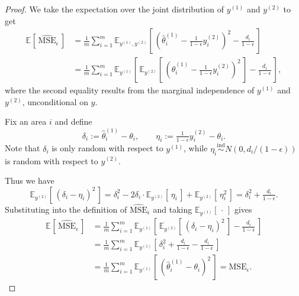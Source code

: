\documentclass[10pt,a4paper]{amsart}
\newcommand{\E}[2][]{\mathbb{E}_{#1}\!\left[\,#2\,\right]}
\newcommand{\ind}{\stackrel{\text{ind}}{\sim}}
\newcommand{\msehat}{\widehat{\mathrm{MSE}}_{\epsilon}}
\newcommand{\msethin}{\mathrm{MSE}_{\epsilon}}
\newcommand{\thetatrain}{\hat{\theta}^{(1)}}           %
\newcommand{\ytest}{y^{(2)}}                            %
\newcommand{\ytrain}{y^{(1)}}                           %
\begin{document}
\begin{proof}
We take the expectation over the joint distribution of $\ytrain$ and $\ytest$ to get
\begin{align*}
    \E{\msehat}
& = \frac{1}{m}\sum_{i=1}^m
   \E[\ytrain, \ytest]{ \left( \thetatrain_i - \tfrac{1}{1-\epsilon}\ytest_i \right)^{\!2}
         - \tfrac{d_i}{1-\epsilon}} \\
&=  \frac{1}{m}\sum_{i=1}^m\E[\ytrain]{\E[\ytest]{\left( \thetatrain_i - \tfrac{1}{1-\epsilon}\ytest_i \right)^{\!2}} - \tfrac{d_i}{1-\epsilon}},
\end{align*}
where the second equality results from the marginal independence of $\ytrain$ and $\ytest$, unconditional on $y$.

Fix an area $i$ and define
\[
\delta_i := \thetatrain_i - \theta_i,
\qquad
\eta_i := \tfrac{1}{1-\epsilon}\ytest_i - \theta_i .
\]
Note that $\delta_i$ is only random with respect to $\ytrain$, while $\eta_i \ind N(0, d_i/(1-\epsilon))$ is random with respect to $\ytest$.

Thus we have
\[
\E[\ytest]{(\delta_i-\eta_i)^2}
=
\delta_i^2 - 2 \delta_i \cdot \E[\ytest]{\eta_i} +  \E[\ytest]{\eta_i^2}
=
\delta_i^2 + \tfrac{d_i}{1-\epsilon}.
\]
Substituting into the definition of $\msehat$ and taking $\E[\ytrain]{\cdot}$ gives
\begin{align*}
    \E{\msehat}
&=  \frac{1}{m}\sum_{i=1}^m\E[\ytrain]{\E[\ytest]{(\delta_i-\eta_i)^2} - \tfrac{d_i}{1-\epsilon}}\\
&=  \frac{1}{m}\sum_{i=1}^m \E[\ytrain]{\delta_i^2 + \tfrac{d_i}{1-\epsilon} - \tfrac{d_i}{1-\epsilon}}  \\
&=
\frac{1}{m}\sum_{i=1}^m \E[\ytrain]{\left( \thetatrain_i - \theta_i \right)^2}
=
\msethin.
\end{align*}
\end{proof}
\end{document}
